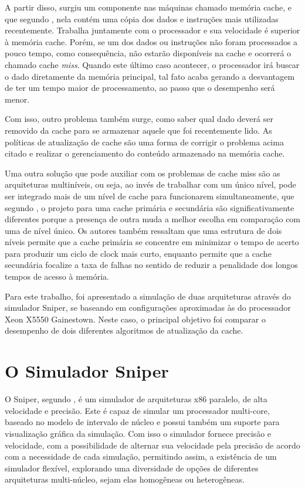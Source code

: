 \documentclass[12pt]{article}
\begin{document}
A partir disso, surgiu um componente nas máquinas chamado memória cache, e que segundo \cite{brito:14}, nela contém uma cópia dos dados e instruções mais utilizadas recentemente. Trabalha juntamente com o processador e sua velocidade é superior à memória cache. Porém, se um dos dados ou instruções não foram processados a pouco tempo, como consequência, não estarão disponíveis na cache e ocorrerá o chamado cache \textit{miss}. Quando este último caso acontecer, o processador irá buscar o dado diretamente da memória principal, tal fato acaba gerando a desvantagem de ter um tempo maior de processamento, ao passo que o desempenho será menor.

Com isso, outro problema também surge, como saber qual dado deverá ser removido da cache para se armazenar aquele que foi recentemente lido. As políticas de atualização de cache são uma forma de corrigir o problema acima citado e realizar o gerenciamento do conteúdo armazenado na memória cache. 

Uma outra solução que pode auxiliar com os problemas de cache miss são as arquiteturas multiníveis, ou seja, ao invés de trabalhar com um único nível, pode ser integrado mais de um nível de cache para funcionarem simultaneamente, que segundo \cite{patterson:14}, o projeto para uma cache primária e secundária são significativamente diferentes porque a presença de outra muda a melhor escolha em comparação com uma de nível único. Os autores também ressaltam que uma estrutura de dois níveis permite que a cache primária se concentre em minimizar o tempo de acerto para produzir um ciclo de clock mais curto, enquanto permite que a cache secundária focalize a taxa de falhas no sentido de reduzir a penalidade dos longos tempos de acesso à memória.

Para este trabalho, foi apresentado a simulação de duas arquiteturas através do simulador Sniper, se baseando em configurações aproximadas às do processador Xeon X5550 Gainestown. Neste caso, o principal objetivo foi comparar o desempenho de dois diferentes algoritmos de atualização da cache.

\section{O Simulador Sniper}

O Sniper, segundo \cite{sniper:2019}, é um simulador de arquiteturas x86 paralelo, de alta velocidade e precisão. Este é capaz de simular um processador multi-core, baseado no modelo de intervalo de núcleo e possui também um suporte para visualização gráfica da simulação. Com isso o simulador fornece precisão e velocidade, com a possibilidade de alternar sua velocidade pela precisão de acordo com a necessidade de cada simulação, permitindo assim, a existência de um simulador flexível, explorando uma diversidade de opções de diferentes arquiteturas multi-núcleo, sejam elas homogêneas ou heterogêneas.
\end{document}
